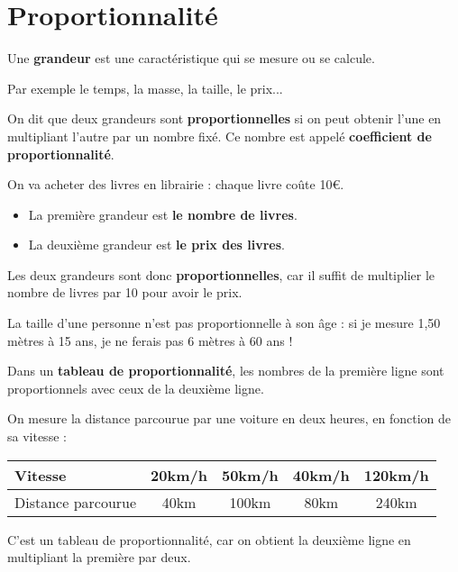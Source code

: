 \documentclass[../€Cours-complet/Cours-complet]{subfiles}
\begin{document}
\maketitleorchapter

\section{Proportionnalité}

\begin{vocabulaire}[Grandeur]
	Une \textbf{grandeur} est une caractéristique qui se mesure ou se calcule.

	Par exemple le temps, la masse, la taille, le prix...
\end{vocabulaire}

\begin{cours}
	On dit que deux grandeurs sont \textbf{proportionnelles} si on peut obtenir l'une en multipliant l'autre par un nombre fixé. Ce nombre est appelé \textbf{coefficient de proportionnalité}.
\end{cours}

\begin{exemple}
	On va acheter des livres en librairie : chaque livre coûte 10€.

	\begin{itemize}
		\item La première grandeur est \textbf{le nombre de livres}.
		\item La deuxième grandeur est \textbf{le prix des livres}.
	\end{itemize}

	Les deux grandeurs sont donc \textbf{proportionnelles}, car il suffit de multiplier le nombre de livres par 10 pour avoir le prix.
\end{exemple}

\begin{exemple}
	La taille d'une personne n'est pas proportionnelle à son âge : si je mesure 1,50 mètres à 15 ans, je ne ferais pas 6 mètres à 60 ans !
\end{exemple}

\begin{cours}
	Dans un \textbf{tableau de proportionnalité}, les nombres de la première ligne sont proportionnels avec ceux de la deuxième ligne.
\end{cours}

\begin{exemple}
	On mesure la distance parcourue par une voiture en deux heures, en fonction de sa vitesse : \vspace{0.5em}

	\begin{tabular}{|l|c|c|c|c|}
		\hline
		Vitesse            & 20km/h & 50km/h & 40km/h & 120km/h \\ \hline
		Distance parcourue & 40km   & 100km  & 80km   & 240km   \\ \hline
	\end{tabular}

	C'est un tableau de proportionnalité, car on obtient la deuxième ligne en multipliant la première par deux.
\end{exemple}
\end{document}
